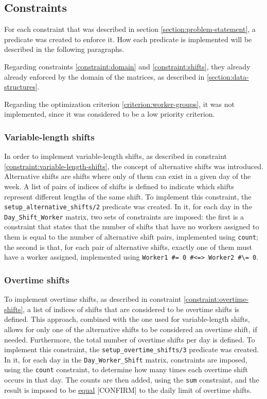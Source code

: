\documentclass[conference]{IEEEtran}
\def\CONFIRM#1{\ul{#1} {\color{red}[CONFIRM]\color{black}}}
\begin{document}
\subsection{Constraints}
\label{section:constraints}

For each constraint that was described in section \ref{section:problem-statement}, a predicate was created to enforce it. How each predicate is implemented will be described in the following paragraphs.

Regarding constraints \ref{constraint:domain} and \ref{constraint:shifts}, they already already enforced by the domain of the matrices, as described in \ref{section:data-structures}.

Regarding the optimization criterion \ref{criterion:worker-groups}, it was not implemented, since it was considered to be a low priority criterion.

\subsubsection*{Variable-length shifts}

In order to implement variable-length shifts, as described in constraint \ref{constraint:variable-length-shifts}, the concept of alternative shifts was introduced. Alternative shifts are shifts where only of them can exist in a given day of the week. A list of pairs of indices of shifts is defined to indicate which shifts represent different lengths of the same shift.
To implement this constraint, the \texttt{setup\_alternative\_shifts/2} predicate was created. In it, for each day in the \texttt{Day\_Shift\_Worker} matrix, two sets of constraints are imposed: the first is a constraint that states that the number of shifts that have no workers assigned to them is equal to the number of alternative shift pairs, implemented using \texttt{count}; the second is that, for each pair of alternative shifts, exactly one of them must have a worker assigned, implemented using \texttt{Worker1 \#= 0 \#<=> Worker2 \#\textbackslash= 0}.

\subsubsection*{Overtime shifts}

To implement overtime shifts, as described in constraint \ref{constraint:overtime-shifts}, a list of indices of shifts that are considered to be overtime shifts is defined. This approach, combined with the one used for variable-length shifts, allows for only one of the alternative shifts to be considered an overtime shift, if needed. Furthermore, the total number of overtime shifts per day is defined.
To implement this constraint, the \texttt{setup\_overtime\_shifts/3} predicate was created. In it, for each day in the \texttt{Day\_Worker\_Shift} matrix, constraints are imposed, using the \texttt{count} constraint, to determine how many times each overtime shift occurs in that day. The counts are then added, using the \texttt{sum} constraint, and the result is imposed to be \CONFIRM{equal} to the daily limit of overtime shifts.
\end{document}
